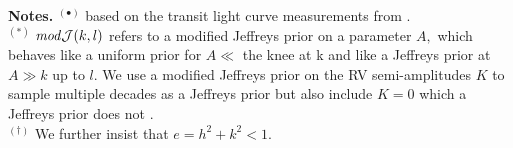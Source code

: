 \begin{table*}
\begin{list}{}{}
\item {\bf{Notes.}} 
  $^{(\bullet)}$ based on the transit light curve measurements from \cite{benneke17}. \\
  $^{(\ast)}$ $\text{\emph{mod}}\mathcal{J}(k,l)$ \mps{}
  refers to a modified Jeffreys prior on a parameter $A,$ which behaves like a uniform
  prior for $A \ll$ the knee at k \mps{} and
   like a Jeffreys prior at $A \gg k$ up to $l$. We use a modified Jeffreys prior on
  the RV semi-amplitudes $K$ to sample multiple decades as a Jeffreys prior but also include
  $K=0$ \mps{} which a Jeffreys prior does not \citep{gregory05}. \\
  $^{(\dagger)}$ We further insist
  that $e = h^2 + k^2 < 1$.
\end{list}
\end{table*}
